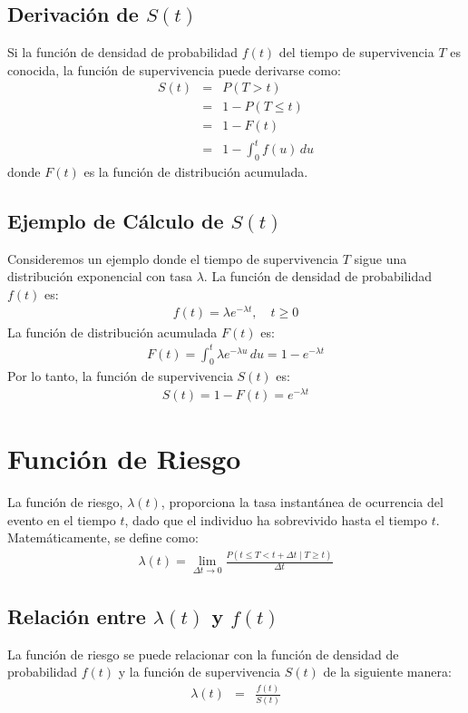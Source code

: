 \documentclass[a4paper]{report} %
\begin{document}
\subsection{Derivaci\'on de $S(t)$}
Si la funci\'on de densidad de probabilidad $f(t)$ del tiempo de supervivencia $T$ es conocida, la funci\'on de supervivencia puede derivarse como:
\begin{eqnarray*}
S(t) &=& P(T > t) \\
     &=& 1 - P(T \leq t) \\
     &=& 1 - F(t) \\
     &=& 1 - \int_0^t f(u) \, du
\end{eqnarray*}
donde $F(t)$ es la funci\'on de distribuci\'on acumulada.

\subsection{Ejemplo de Cálculo de $S(t)$}
Consideremos un ejemplo donde el tiempo de supervivencia $T$ sigue una distribuci\'on exponencial con tasa $\lambda$. La funci\'on de densidad de probabilidad $f(t)$ es:
\begin{eqnarray*}
f(t) = \lambda e^{-\lambda t}, \quad t \geq 0
\end{eqnarray*}
La funci\'on de distribuci\'on acumulada $F(t)$ es:
\begin{eqnarray*}
F(t) = \int_0^t \lambda e^{-\lambda u} \, du = 1 - e^{-\lambda t}
\end{eqnarray*}
Por lo tanto, la funci\'on de supervivencia $S(t)$ es:
\begin{eqnarray*}
S(t) = 1 - F(t) = e^{-\lambda t}
\end{eqnarray*}

\section{Funci\'on de Riesgo}
La funci\'on de riesgo, $\lambda(t)$, proporciona la tasa instant\'anea de ocurrencia del evento en el tiempo $t$, dado que el individuo ha sobrevivido hasta el tiempo $t$. Matem\'aticamente, se define como:
\begin{eqnarray*}
\lambda(t) = \lim_{\Delta t \to 0} \frac{P(t \leq T < t + \Delta t \mid T \geq t)}{\Delta t}
\end{eqnarray*}

\subsection{Relaci\'on entre $\lambda(t)$ y $f(t)$}
La funci\'on de riesgo se puede relacionar con la funci\'on de densidad de probabilidad $f(t)$ y la funci\'on de supervivencia $S(t)$ de la siguiente manera:
\begin{eqnarray*}
\lambda(t) &=& \frac{f(t)}{S(t)}
\end{eqnarray*}
\end{document}
